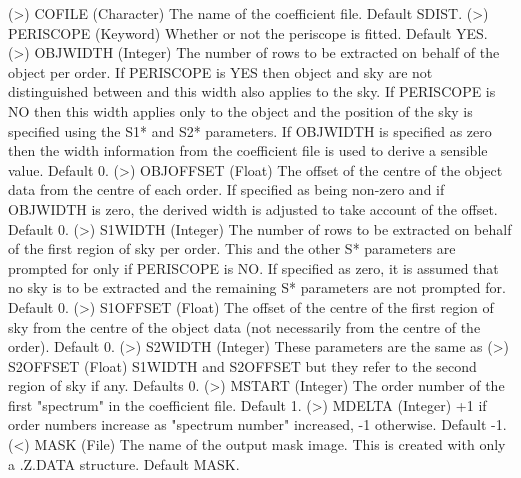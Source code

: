 \begin{description}
\begin{description}
\begin{terminalv}
    (>) COFILE        (Character) The name of the coefficient file.
                      Default SDIST.
    (>) PERISCOPE     (Keyword) Whether or not the periscope is fitted.
                      Default YES.
    (>) OBJWIDTH      (Integer) The number of rows to be extracted on
                      behalf of the object per order.  If PERISCOPE is
                      YES then object and sky are not distinguished
                      between and this width also applies to the sky.
                      If PERISCOPE is NO then this width applies
                      only to the object and the position of the sky
                      is specified using the S1* and S2* parameters.
                      If OBJWIDTH is specified as zero then the width
                      information from the coefficient file is used to
                      derive a sensible value. Default 0.
    (>) OBJOFFSET     (Float) The offset of the centre of the object
                      data from the centre of each order. If specified
                      as being non-zero and if OBJWIDTH is zero, the
                      derived width is adjusted to take account of the
                      offset. Default 0.
    (>) S1WIDTH       (Integer) The number of rows to be extracted on
                      behalf of the first region of sky per order.
                      This and the other S* parameters are prompted
                      for only if PERISCOPE is NO. If specified as
                      zero, it is assumed that no sky is to be
                      extracted and the remaining S* parameters are
                      not prompted for. Default 0.
    (>) S1OFFSET      (Float) The offset of the centre of the first
                      region of sky from the centre of the object data
                      (not necessarily from the centre of the order).
                      Default 0.
    (>) S2WIDTH       (Integer) These parameters are the same as
    (>) S2OFFSET      (Float)   S1WIDTH and S2OFFSET but they refer to
                                the second region of sky if any.
                                Defaults 0.
    (>) MSTART        (Integer) The order number of the first
                      "spectrum" in the coefficient file. Default 1.
    (>) MDELTA        (Integer) +1 if order numbers increase as
                      "spectrum number" increased, -1 otherwise.
                      Default -1.
    (<) MASK          (File) The name of the output mask image. This
                      is created with only a .Z.DATA structure.
                      Default MASK.


\end{terminalv}
\end{description}
\end{description}
